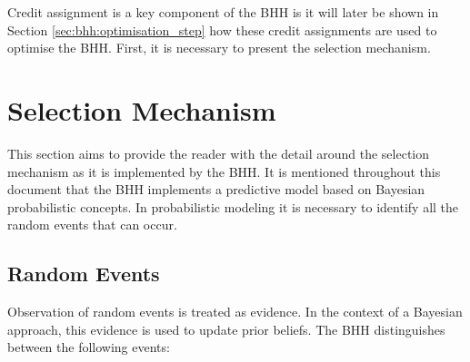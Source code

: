 \begin{table}[htbp]
	\centering
	\caption{Credit assignment strategy output table showing \textit{ibest} credit assignment for the first 5 entity's and their selected heuristics for step 1 of the training process.}
	\label{tab:bhh:credit_assignment_strategy:credit_assignment_example}%
	\par\bigskip
\end{table}%

Credit assignment is a key component of the \ac{BHH} is it will later be shown in Section \ref{sec:bhh:optimisation_step} how these credit assignments are used to optimise the \ac{BHH}. First, it is necessary to present the selection mechanism.


\section{Selection Mechanism}
\label{sec:bhh:selection_mechanism}

This section aims to provide the reader with the detail around the selection mechanism as it is implemented by the \ac{BHH}. It is mentioned throughout this document that the \ac{BHH} implements a predictive model based on Bayesian probabilistic concepts. In probabilistic modeling it is necessary to identify all the random events that can occur.

\subsection{Random Events}
\label{sec:bhh:selection_mechanism:random_events}

Observation of random events is treated as evidence. In the context of a Bayesian approach, this evidence is used to update prior beliefs. The \ac{BHH} distinguishes between the following events:

